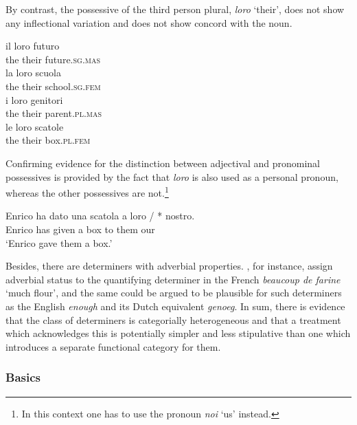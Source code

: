 \documentclass[output=paper
	        ,collection
	        ,collectionchapter
 	        ,biblatex
                ,babelshorthands
                ,newtxmath
                ,draftmode
                ,colorlinks, citecolor=brown
]{langscibook}
\begin{document}
\noindent
By contrast, the possessive of the third person plural, \emph{loro} `their',
does not show any inflectional variation and does not show concord with the noun.

\begin{exe} 
\ex 
\begin{xlist}
\ex 
\gll  il loro futuro \\   
      the their future.\textsc{sg.mas}  \\ 
\ex 
\gll  la loro scuola  \\   
      the their school.\textsc{sg.fem}   \\ 
\ex 
\gll  i loro genitori \\   
      the their parent.\textsc{pl.mas} \\ 
\ex 
\gll  le loro scatole \\   
      the their box.\textsc{pl.fem} \\ 
\end{xlist} 
\end{exe}

\noindent
Confirming evidence for the distinction between adjectival and pronominal possessives
is provided by the fact that \emph{loro} is also used as a personal pronoun, 
whereas the other possessives are not.\footnote{In this context one has to use 
the pronoun \emph{noi} `us' instead.} 

\begin{exe} 
\ex 
\gll   Enrico ha  dato  una scatola a  loro /  *  nostro. \\
       Enrico has given a   box     to them {} {} our     \\
\trans `Enrico gave them a box.'
\end{exe} 

\noindent
Besides, there are determiners with adverbial properties. 
\citet{Abeilleetal04}, for instance, 
assign adverbial status to the quantifying determiner in the French 
\emph{beaucoup de farine} `much flour', and the same could be argued to 
be plausible for such determiners as the English \emph{enough} and its 
Dutch equivalent \emph{genoeg}. 
In sum, there is evidence that the class of determiners is categorially 
heterogeneous and that a treatment which acknowledges this is potentially 
simpler and less stipulative than one which introduces a separate functional 
category for them. 
 

\subsubsection{Basics} 
\label{sec-basics}
\end{document}
